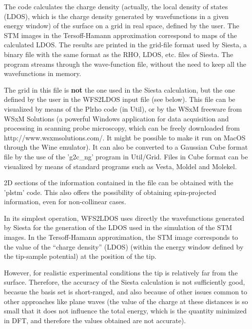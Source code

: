 The code calculates the charge density (actually, the local density of
states (LDOS), which is the charge density generated by wavefunctions
in a given energy window) of the surface on a grid in real space,
defined by the user. The STM images in the Tersoff-Hamann
approximation correspond to maps of the calculated LDOS.
The results are printed in the grid-file format used by {\sc Siesta},
a  binary file with the same format as the RHO, LDOS, etc. files of
{\sc Siesta}. The program streams through the wave-function file,
without the need to keep all the wavefunctions in memory.

The grid in this file is {\bf not} the one used in the {\sc Siesta}
calculation, but the one defined by the user in the {\sc WFS2LDOS} input
file (see below).  This file can be visualized by means of the {\sc
  Plrho} code (in Util), or by the WSxM freeware from WSxM Solutions
(a powerful Windows application for data acquisition and processing in
scanning probe microscopy, which can be freely downloaded from
http://www.wsxmsolutions.com/. It might be possible to make it run on
MacOS through the Wine emulator).  It can also be converted to a
Gaussian Cube format file by the use of the 'g2c\_ng' program in
Util/Grid. Files in Cube format can be visualized by means of standard
programs such as {\sc Vesta}, {\sc Moldel} and {\sc Molekel}.

2D sections of the information contained in the file can be obtained
with the 'plstm' code. This also offers the possibility of obtaining
spin-projected information, even for non-collinear cases.

In its simplest operation, {\sc WFS2LDOS} uses directly the wavefunctions
generated by {\sc Siesta} for the generation of the LDOS used in the
simulation of the STM images.  In the Tersoff-Hamann approximation,
the STM image corresponds to the value of the ``charge density''
(LDOS) (within the energy window defined by the tip-sample potential)
at the position of the tip.

However, for realistic experimental conditions the tip is relatively
far from the surface. Therefore, the accuracy of the {\sc Siesta}
calculation is not sufficiently good, becasue the basis set is
short-ranged, and also because of other issues common to other
approaches like plane waves (the value of the charge at these
distances is so small that it does not influence the total energy,
which is the quantity minimized in DFT, and therefore the values
obtained are not accurate).

